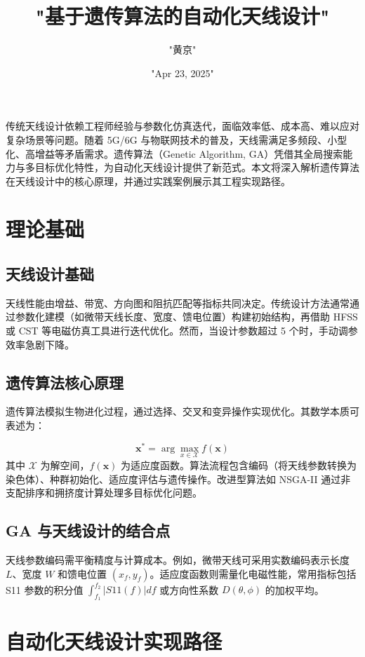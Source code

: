 \title{"基于遗传算法的自动化天线设计"}
\author{"黄京"}
\date{"Apr 23, 2025"}
\maketitle
传统天线设计依赖工程师经验与参数化仿真迭代，面临效率低、成本高、难以应对复杂场景等问题。随着 5G/6G 与物联网技术的普及，天线需满足多频段、小型化、高增益等矛盾需求。遗传算法（Genetic Algorithm, GA）凭借其全局搜索能力与多目标优化特性，为自动化天线设计提供了新范式。本文将深入解析遗传算法在天线设计中的核心原理，并通过实践案例展示其工程实现路径。\par
\chapter{理论基础}
\section{天线设计基础}
天线性能由增益、带宽、方向图和阻抗匹配等指标共同决定。传统设计方法通常通过参数化建模（如微带天线长度、宽度、馈电位置）构建初始结构，再借助 HFSS 或 CST 等电磁仿真工具进行迭代优化。然而，当设计参数超过 5 个时，手动调参效率急剧下降。\par
\section{遗传算法核心原理}
遗传算法模拟生物进化过程，通过选择、交叉和变异操作实现优化。其数学本质可表述为：\par
$$ \mathbf{x}^* = \arg\max_{x \in \mathcal{X}} f(\mathbf{x}) $$
其中 $\mathcal{X}$ 为解空间，$f(\mathbf{x})$ 为适应度函数。算法流程包含编码（将天线参数转换为染色体）、种群初始化、适应度评估与遗传操作。改进型算法如 NSGA-II 通过非支配排序和拥挤度计算处理多目标优化问题。\par
\section{GA 与天线设计的结合点}
天线参数编码需平衡精度与计算成本。例如，微带天线可采用实数编码表示长度 $L$、宽度 $W$ 和馈电位置 $(x_f, y_f)$。适应度函数则需量化电磁性能，常用指标包括 S11 参数的积分值 $\int_{f_1}^{f_2} |S11(f)| df$ 或方向性系数 $D(\theta,\phi)$ 的加权平均。\par
\chapter{自动化天线设计实现路径}
